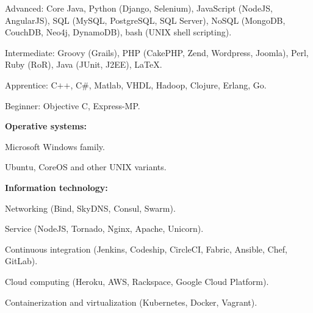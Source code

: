     \begin{innerlist}
\item Advanced: Core Java, Python (Django, Selenium), JavaScript
(NodeJS, AngularJS), SQL (MySQL, PostgreSQL,
SQL Server), NoSQL (MongoDB, CouchDB, Neo4j, DynamoDB), bash (UNIX shell
scripting).
\item Intermediate: Groovy (Grails), PHP
(CakePHP, Zend, Wordpress, Joomla), Perl, Ruby (RoR), 
Java (JUnit, J2EE), \LaTeX{}.
\item Apprentice: C$+$$+$, C\#, Matlab, VHDL, Hadoop, Clojure,
Erlang, Go.
\item Beginner: Objective C, Express-MP.
    \end{innerlist}

\halfblankline

\textbf{Operative systems:}
    \begin{innerlist}
\item Microsoft Windows family.
\item Ubuntu, CoreOS and other UNIX variants.
    \end{innerlist}

\halfblankline

\textbf{Information technology:} 
    \begin{innerlist}
\item Networking (Bind, SkyDNS, Consul, Swarm).
\item Service (NodeJS, Tornado, Nginx, Apache, Unicorn).
\item Continuous integration (Jenkins, Codeship, CircleCI,
Fabric, Ansible, Chef, GitLab).
\item Cloud computing (Heroku, AWS, Rackspace, Google Cloud Platform).
\item Containerization and virtualization (Kubernetes, Docker, Vagrant).
    \end{innerlist}

% 
% 
% 


